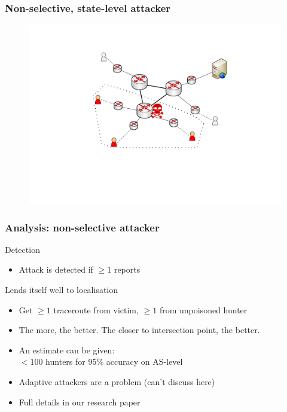 \begin{frame}
\frametitle{Non-selective, state-level attacker}
\begin{block}{}
  \begin{figure}[t]
    \centering
    \includegraphics[scale=.5]{figures/scenario5-stateattacker-non-selective.pdf}
  \end{figure}
\end{block}
\end{frame}




\begin{frame}
\frametitle{Analysis: non-selective attacker}
\begin{block}{Detection}
  \begin{itemize}
    \item Attack is detected if $\geq 1$ reports
  \end{itemize}
\end{block}
\begin{block}{Lends itself well to localisation}
  \begin{itemize}
    \item Get $\geq 1$ traceroute from victim,  $\geq 1$ from unpoisoned hunter 
    \item The more, the better. The closer to intersection point, the better.
    \item An estimate can be given: \\ $<100$ hunters for $95\%$ accuracy on AS-level
    \item Adaptive attackers are a problem (can't discuss here)
    \item Full details in our research paper
  \end{itemize}
\end{block}
\end{frame}



